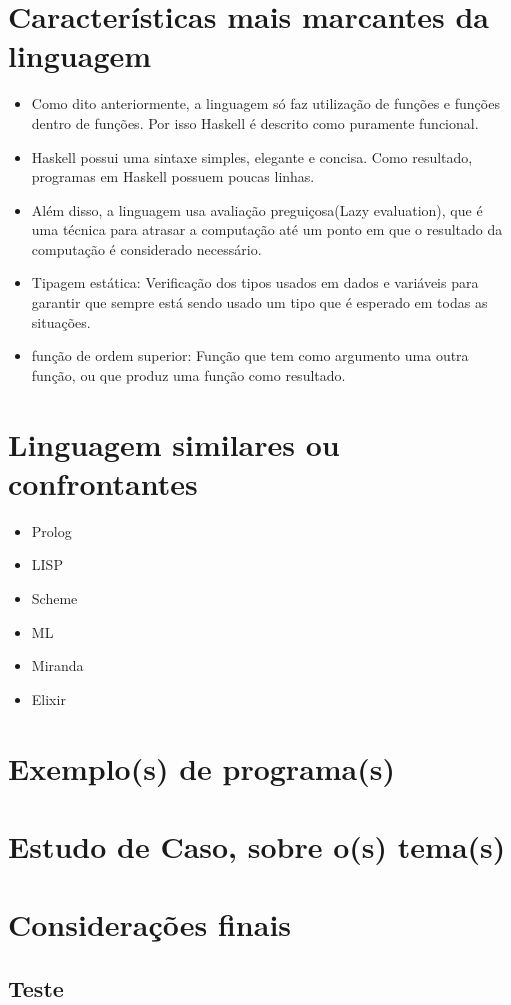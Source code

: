 \documentclass[12pt,openright,a4paper,brazil]{abntex2}
\begin{document}
    \chapter{Características mais marcantes da linguagem}

    \begin{itemize}
      \item Como dito anteriormente, a linguagem só faz utilização de funções e funções dentro de funções. Por isso
      Haskell é descrito como puramente funcional.
      \item Haskell possui uma sintaxe simples, elegante e concisa. Como resultado, programas em Haskell possuem 
      poucas linhas. 
      \item Além disso, a linguagem usa avaliação preguiçosa(Lazy evaluation), que é uma técnica para atrasar a computação 
      até um ponto em que o resultado da computação é considerado necessário.
      \item Tipagem estática: Verificação dos tipos usados em dados e variáveis para 
      garantir que sempre está sendo usado um tipo que é esperado em todas as situações. 
      \item função de ordem superior: Função que tem como argumento uma outra função, ou que produz 
      uma função como resultado.
    \end{itemize}

    \chapter{Linguagem similares ou confrontantes}

    \begin{itemize}
      \item Prolog
      \item LISP 
      \item Scheme 
      \item ML 
      \item Miranda 
      \item Elixir 
    \end{itemize}

    \chapter{Exemplo(s) de programa(s)}
    \chapter{Estudo de Caso, sobre o(s) tema(s)}
    \chapter{Considerações finais}

    \begin{apendicesenv}

        \partapendices
        \chapter{Teste}
    
    \end{apendicesenv}
\end{document}
